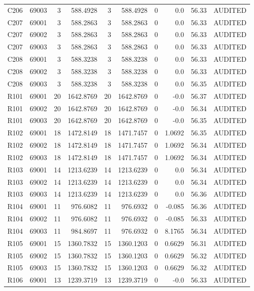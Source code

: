\begin{tabular}{lrrrrrrrrr}
C206 & 69003 & 3 & 588.4928 & 3 & 588.4928 & 0 & 0.0 & 56.33 & AUDITED \\
C207 & 69001 & 3 & 588.2863 & 3 & 588.2863 & 0 & 0.0 & 56.33 & AUDITED \\
C207 & 69002 & 3 & 588.2863 & 3 & 588.2863 & 0 & 0.0 & 56.33 & AUDITED \\
C207 & 69003 & 3 & 588.2863 & 3 & 588.2863 & 0 & 0.0 & 56.33 & AUDITED \\
C208 & 69001 & 3 & 588.3238 & 3 & 588.3238 & 0 & 0.0 & 56.33 & AUDITED \\
C208 & 69002 & 3 & 588.3238 & 3 & 588.3238 & 0 & 0.0 & 56.33 & AUDITED \\
C208 & 69003 & 3 & 588.3238 & 3 & 588.3238 & 0 & 0.0 & 56.35 & AUDITED \\
R101 & 69001 & 20 & 1642.8769 & 20 & 1642.8769 & 0 & -0.0 & 56.37 & AUDITED \\
R101 & 69002 & 20 & 1642.8769 & 20 & 1642.8769 & 0 & -0.0 & 56.34 & AUDITED \\
R101 & 69003 & 20 & 1642.8769 & 20 & 1642.8769 & 0 & -0.0 & 56.35 & AUDITED \\
R102 & 69001 & 18 & 1472.8149 & 18 & 1471.7457 & 0 & 1.0692 & 56.35 & AUDITED \\
R102 & 69002 & 18 & 1472.8149 & 18 & 1471.7457 & 0 & 1.0692 & 56.34 & AUDITED \\
R102 & 69003 & 18 & 1472.8149 & 18 & 1471.7457 & 0 & 1.0692 & 56.34 & AUDITED \\
R103 & 69001 & 14 & 1213.6239 & 14 & 1213.6239 & 0 & 0.0 & 56.34 & AUDITED \\
R103 & 69002 & 14 & 1213.6239 & 14 & 1213.6239 & 0 & 0.0 & 56.34 & AUDITED \\
R103 & 69003 & 14 & 1213.6239 & 14 & 1213.6239 & 0 & 0.0 & 56.36 & AUDITED \\
R104 & 69001 & 11 & 976.6082 & 11 & 976.6932 & 0 & -0.085 & 56.36 & AUDITED \\
R104 & 69002 & 11 & 976.6082 & 11 & 976.6932 & 0 & -0.085 & 56.33 & AUDITED \\
R104 & 69003 & 11 & 984.8697 & 11 & 976.6932 & 0 & 8.1765 & 56.34 & AUDITED \\
R105 & 69001 & 15 & 1360.7832 & 15 & 1360.1203 & 0 & 0.6629 & 56.31 & AUDITED \\
R105 & 69002 & 15 & 1360.7832 & 15 & 1360.1203 & 0 & 0.6629 & 56.32 & AUDITED \\
R105 & 69003 & 15 & 1360.7832 & 15 & 1360.1203 & 0 & 0.6629 & 56.32 & AUDITED \\
R106 & 69001 & 13 & 1239.3719 & 13 & 1239.3719 & 0 & -0.0 & 56.33 & AUDITED \\

\end{tabular}
